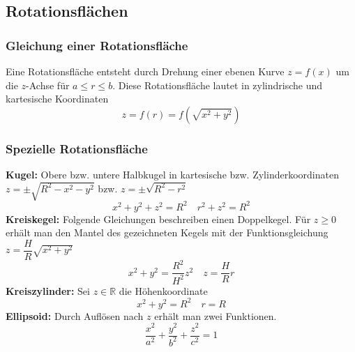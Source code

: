 \subsection{Rotationsflächen}
\subsubsection{Gleichung einer Rotationsfläche}
Eine Rotationsfläche entsteht durch Drehung einer ebenen Kurve $z=f\left(x\right)$ um die $z$-Achse für $a\leq r\leq b$. Diese Rotationsfläche lautet in zylindrische und kartesische  Koordinaten
\begin{equation}
\boxed{z=f\left(r\right)=f\left(\sqrt{x^2+y^2}\right)}
\end{equation}
\subsubsection{Spezielle Rotationsfläche}
\textbf{Kugel:} Obere bzw. untere Halbkugel in kartesische  bzw. Zylinderkoordinaten $z=\pm\sqrt{R^2-x^2-y^2}$ bzw. $z=\pm\sqrt{R^2-r^2}$
\begin{equation}
\boxed{x^2+y^2+z^2=R^2}\quad \boxed{r^2+z^2=R^2}
\end{equation}
\textbf{Kreiskegel:} Folgende Gleichungen beschreiben einen Doppelkegel. Für $z\geq 0$ erhält man den Mantel des gezeichneten Kegels mit der Funktionsgleichung $z=\dfrac{H}{R}\sqrt{x^2+y^2}$
\begin{equation}
\boxed{x^2+y^2=\dfrac{R^2}{H^2}z^2}\quad \boxed{z=\dfrac{H}{R}r}
\end{equation}
\textbf{Kreiszylinder:} Sei $z\in \mathbb{R}$ die Höhenkoordinate
\begin{equation}
\boxed{x^2+y^2=R^2}\quad \boxed{r=R}
\end{equation}
\textbf{Ellipsoid:} Durch Auflösen nach $z$ erhält man zwei Funktionen.
\begin{equation}
\boxed{\dfrac{x^2}{a^2}+\dfrac{y^2}{b^2}+\dfrac{z^2}{c^2}=1}
\end{equation}
